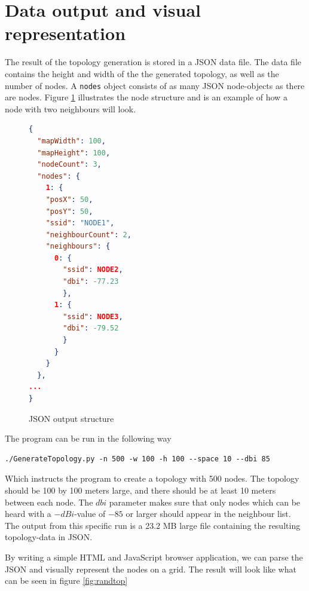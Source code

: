 			\section{Data output and visual representation} \label{simulationrep}
			The result of the topology generation is stored in a JSON\cite{JSON} data file. The data file contains the height and width of the the generated topology, as well
			as the number of nodes. A \verb|nodes| object consists of as many JSON node-objects as there are nodes. Figure \ref{fig:nodeStruct} illustrates the node structure
			and is an example of how a node with two neighbours will look.
			\begin{figure}[H]
			\begin{minipage}{\linewidth}
			\begin{lstlisting}[language=json]
{
  "mapWidth": 100,
  "mapHeight": 100,
  "nodeCount": 3,
  "nodes": {
    1: {
    "posX": 50,
    "posY": 50, 
    "ssid": "NODE1", 
    "neighbourCount": 2, 
    "neighbours": {
      0: {
        "ssid": NODE2,
        "dbi": -77.23
        },
      1: {
        "ssid": NODE3,
        "dbi": -79.52
        }
      }
    }
  },
...
}
\end{lstlisting}
\end{minipage}
\caption{JSON output structure}
\label{fig:nodeStruct}

\end{figure}
The program can be run in the following way
\begin{verbatim}./GenerateTopology.py -n 500 -w 100 -h 100 --space 10 --dbi 85 \end{verbatim}
Which instructs the program to create a topology with 500 nodes. The topology should be 100 by 100 meters large, and there should be at least 10 meters
between each node. The $dbi$ parameter makes sure that only nodes which can be heard with a $-dBi$-value of $-85$ or larger should appear in the neighbour list. 
The output from this specific run is a 23.2 MB large file containing the resulting topology-data in JSON.

By writing a simple HTML and JavaScript browser application, we can parse the JSON and visually represent the nodes on a grid.
The result will look like what can be seen in figure \ref{fig:randtop}

